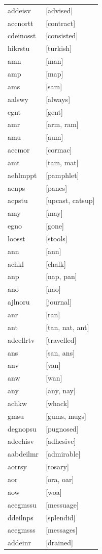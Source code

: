 \documentclass{article}
\begin{document}
\begin{tabular}{ll}
addeisv & [advised] \\
accnortt & [contract] \\
cdeinosst & [consisted] \\
hikrstu & [turkish] \\
amn & [man] \\
amp & [map] \\
ams & [sam] \\
aalswy & [always] \\
egnt & [gent] \\
amr & [arm, ram] \\
amu & [aum] \\
accmor & [cormac] \\
amt & [tam, mat] \\
aehlmppt & [pamphlet] \\
aenps & [panes] \\
acpstu & [upcast, catsup] \\
amy & [may] \\
egno & [gone] \\
loosst & [stools] \\
ann & [ann] \\
achkl & [chalk] \\
anp & [nap, pan] \\
ano & [nao] \\
ajlnoru & [journal] \\
anr & [ran] \\
ant & [tan, nat, ant] \\
adeellrtv & [travelled] \\
ans & [san, ans] \\
anv & [van] \\
anw & [wan] \\
any & [any, nay] \\
achkw & [whack] \\
gmsu & [gums, mugs] \\
degnopsu & [pugnosed] \\
adeehisv & [adhesive] \\
aabdeilmr & [admirable] \\
aorrsy & [rosary] \\
aor & [ora, oar] \\
aow & [woa] \\
aeegmssu & [messuage] \\
ddeilnps & [splendid] \\
aeegmsss & [messages] \\
addeinr & [drained] \\

\end{tabular}
\end{document}
